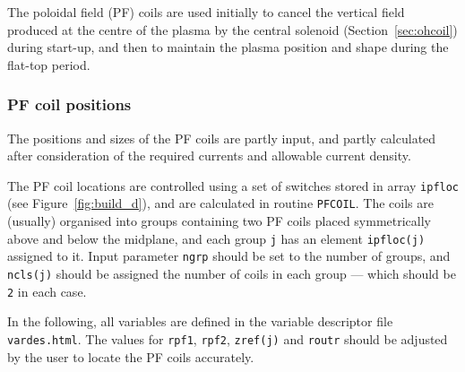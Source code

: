 \documentclass[11pt,a4paper]{report}
\begin{document}
The poloidal field (PF) coils are used initially to cancel the vertical field
produced at the centre of the plasma by the central solenoid (Section~\ref{sec:ohcoil})
during start-up, and then to maintain the plasma position and shape during the
flat-top period.

\subsubsection{PF coil positions}

The positions and sizes of the PF coils are partly input, and partly
calculated after consideration of the required currents and allowable current
density.

The PF coil locations are controlled using a set of switches stored in array
\texttt{ipfloc} (see Figure~\ref{fig:build_d}), and are calculated in routine
\texttt{PFCOIL}. The coils are (usually) organised into groups containing two
PF coils placed symmetrically above and below the midplane, and each group
\texttt{j} has an element \texttt{ipfloc(j)} assigned to it. Input parameter
\texttt{ngrp} should be set to the number of groups, and \texttt{ncls(j)}
should be assigned the number of coils in each group --- which should be
\texttt{2} in each case.

In the following, all variables are defined in the variable descriptor file
\texttt{vardes.html}. The values for \texttt{rpf1}, \texttt{rpf2},
\texttt{zref(j)} and \texttt{routr} should be adjusted by the user to locate
the PF coils accurately.
\end{document}
